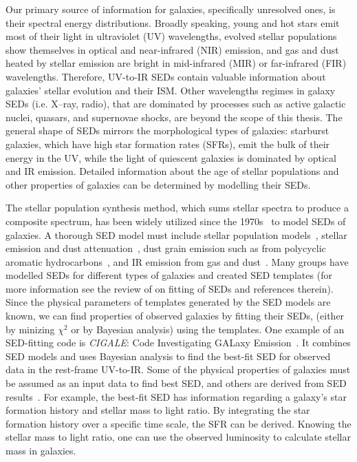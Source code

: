 Our primary source of information for galaxies, specifically unresolved ones, is their spectral energy distributions. 
Broadly speaking, young and hot stars emit most of their light in ultraviolet (UV) wavelengths, evolved stellar populations show themselves in optical and near-infrared (NIR) emission, and gas and dust heated by stellar emission are bright in mid-infrared (MIR) or far-infrared (FIR) wavelengths.
Therefore, UV-to-IR SEDs contain valuable information about galaxies' stellar evolution and their ISM. 
Other wavelengths regimes in galaxy SEDs (i.e. X--ray, radio), that are dominated by processes such as active galactic nuclei, quasars, and supernovae shocks, are beyond the scope of this thesis.
The general shape of SEDs mirrors the morphological types of galaxies: starburst galaxies, which have high star formation rates (SFRs), emit the bulk of their energy in the UV, while the light of quiescent galaxies is dominated by optical and IR emission. 
Detailed information about the age of stellar populations and other properties of galaxies can be determined by modelling their SEDs.

The stellar population synthesis method, which sums stellar spectra to produce a composite spectrum, has been widely utilized since the 1970s~\citep[e.g.][]{Tinsley72,Searle73} to model SEDs of galaxies.
A thorough SED model must include stellar population models~\citep[e.g.][]{Bruzual93,Bruzual03,Maraston05}, stellar emission and dust attenuation~\citep[e.g.][]{Calzetti00,Dopita05}, dust grain emission such as from polycyclic aromatic hydrocarbons~\citep[PAHs; e.g.][and references therein]{Tielens08}, and IR emission from gas and dust~\citep[e.g.][]{Chary01,Dale02,Lagache03,Lagache04,Smith07a,Draine07}.
Many groups have modelled SEDs for different types of galaxies and created SED templates (for more information see the review of \cite{Walcher11} on fitting of SEDs and references therein).
Since the physical parameters of templates generated by the SED models are known, we can find properties of observed galaxies by fitting their SEDs, (either by minizing $\chi^2$ or by Bayesian analysis)  using the templates.
One example of an SED-fitting code is {\em CIGALE}: Code Investigating GALaxy Emission~\citep{Noll09}.
It combines SED models and uses Bayesian analysis to find the best-fit SED for observed data in the rest-frame UV-to-IR.
Some of the physical properties of galaxies must be assumed as an input data to find best SED, and others are derived from SED results~\citep[See][for more detail]{Walcher08}.
For example, the best-fit SED has information regarding a galaxy's star formation history and stellar mass to light ratio.
By integrating the star formation history over a specific time scale, the SFR can be derived. %
Knowing the stellar mass to light ratio, one can use the observed luminosity to calculate stellar mass in galaxies.

